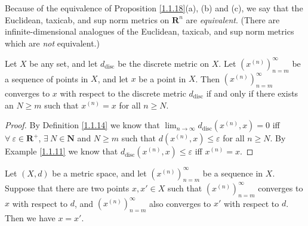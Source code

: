 \begin{note}
    Because of the equivalence of Proposition \ref{1.1.18}(a), (b) and (c), we say that the Euclidean, taxicab, and sup norm metrics on \(\mathbf{R}^n\) are \emph{equivalent}.
    (There are infinite-dimensional analogues of the Euclidean, taxicab, and sup norm metrics which are \emph{not} equivalent.)
\end{note}

\begin{proposition}\label{1.1.19}
    Let \(X\) be any set, and let \(d_{\text{disc}}\) be the discrete metric on \(X\).
    Let \((x^{(n)})_{n = m}^\infty\) be a sequence of points in \(X\), and let \(x\) be a point in \(X\).
    Then \((x^{(n)})_{n = m}^\infty\) converges to \(x\) with respect to the discrete metric \(d_{\text{disc}}\) if and only if there exists an \(N \geq m\) such that \(x^{(n)} = x\) for all \(n \geq N\).
\end{proposition}

\begin{proof}
    By Definition \ref{1.1.14} we know that \(\lim_{n \to \infty} d_{\text{disc}}(x^{(n)}, x) = 0\) iff \(\forall\ \varepsilon \in \mathbf{R}^+\), \(\exists\ N \in \mathbf{N}\) and \(N \geq m\) such that \(d(x^{(n)}, x) \leq \varepsilon\) for all \(n \geq N\).
    By Example \ref{1.1.11} we know that \(d_{\text{disc}}(x^{(n)}, x) \leq \varepsilon\) iff \(x^{(n)} = x\).
\end{proof}

\begin{proposition}\label{1.1.20}
    Let \((X, d)\) be a metric space, and let \((x^{(n)})_{n = m}^\infty\) be a sequence in \(X\).
    Suppose that there are two points \(x, x' \in X\) such that \((x^{(n)})_{n = m}^\infty\) converges to \(x\) with respect to \(d\), and \((x^{(n)})_{n = m}^\infty\) also converges to \(x'\) with respect to \(d\).
    Then we have \(x = x'\).
\end{proposition}

